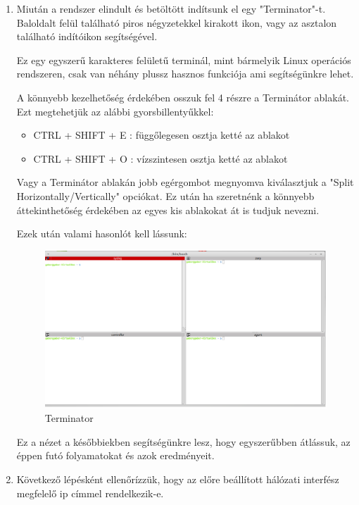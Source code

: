 \documentclass[a4paper,12pt,oneside]{report}
\begin{document}
\begin{enumerate}
\item  Miután a rendszer elindult és betöltött indítsunk el egy "Terminator"-t. Baloldalt felül található piros négyzetekkel kirakott ikon, vagy az asztalon található indítóikon segítségével.

Ez egy egyszerű karakteres felületű terminál, mint bármelyik Linux operációs rendszeren, csak van néhány plussz hasznos funkciója ami segítségünkre lehet.

A könnyebb kezelhetőség érdekében osszuk fel 4 részre a Terminátor ablakát.
Ezt megtehetjük az alábbi gyorsbillentyűkkel:
\begin{itemize}
\itemsep0em
\item CTRL + SHIFT + E : függőlegesen osztja ketté az ablakot
\item CTRL + SHIFT + O : vízszintesen osztja ketté az ablakot
\end{itemize}
Vagy a Terminátor ablakán jobb egérgombot megnyomva kiválasztjuk a "Split Horizontally/Vertically" opciókat. Ez után ha szeretnénk a könnyebb áttekinthetőség érdekében az egyes kis ablakokat át is tudjuk nevezni.

Ezek után valami hasonlót kell lássunk:
\begin{figure}[h]
	  \includegraphics[width=1\textwidth,keepaspectratio]{1.png}
		  \caption{Terminator}
	  \label{fig:terminator}
\end{figure}

Ez a nézet a későbbiekben segítségünkre lesz, hogy egyszerűbben átlássuk, az éppen futó folyamatokat és azok eredményeit.

\item Következő lépésként ellenőrízzük, hogy az előre beállított hálózati interfész megfelelő ip címmel rendelkezik-e.


\end{enumerate}
\end{document}
